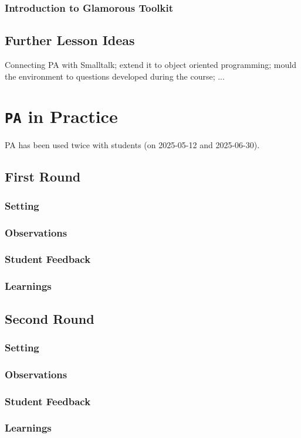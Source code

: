 \subsection{Introduction to Glamorous Toolkit} \label{ssc_lesson_gt}

\section{Further Lesson Ideas} \label{sc_lesson_other}
Connecting PA with Smalltalk; extend it to object oriented programming; mould the environment to questions developed during the course; ...

\chapter{\texttt{PA} in Practice} \label{ch_practice}
PA has been used twice with students (on 2025-05-12 and 2025-06-30).

\section{First Round}
\subsection{Setting}
\subsection{Observations}
\subsection{Student Feedback}
\subsection{Learnings}

\section{Second Round}
\subsection{Setting}
\subsection{Observations}
\subsection{Student Feedback}
\subsection{Learnings}
